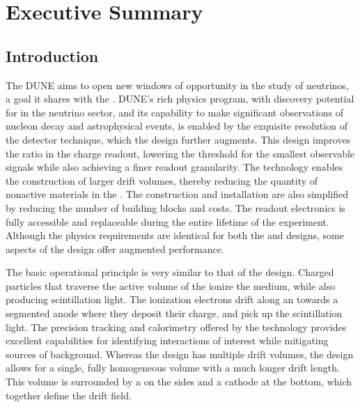 \chapter{Executive Summary}
\label{ch:dp-execsum}



\section{Introduction}
\label{sec:dp-execsum-introduction}


The DUNE   aims to open new windows of opportunity in the study of neutrinos, a goal it shares with the . 
 DUNE's rich physics program, with discovery potential for  in the neutrino sector, and its capability to make significant observations of nucleon decay and astrophysical events, is enabled by the exquisite resolution of the \lartpc detector technique, which the \dual design further augments. This design improves the  ratio in the charge readout, lowering the threshold for the smallest observable signals while also achieving a finer readout granularity.  The \dual technology enables the construction of larger drift volumes, thereby reducing  the quantity of nonactive materials in the \lar. The  construction and installation are also simplified by reducing the number of  building blocks and costs. The readout electronics is fully accessible and replaceable during the entire lifetime of the experiment. Although the physics requirements are identical for both the \single and \dual designs, some aspects of the \dual design offer augmented performance. 

The basic operational principle is very similar to that of the \single design.  Charged particles that traverse the active volume of the \lartpc ionize the medium, while also producing scintillation light.  The ionization electrons drift along an \efield towards a segmented anode where they deposit their charge, and  pick up the scintillation light. The precision tracking and calorimetry offered by the \dual technology provides excellent capabilities for identifying interactions of interest while mitigating sources of background.  Whereas the \single design has multiple drift volumes, the  design allows for a single, fully homogeneous \lar volume with a much longer drift length. This volume is surrounded by a  on the sides and a cathode at the bottom, which together define the drift field. 

